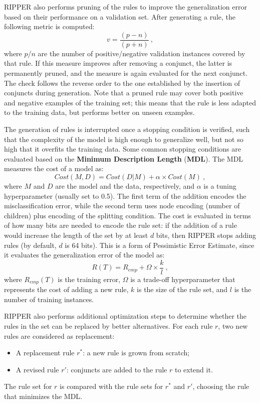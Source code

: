 RIPPER also performs pruning of the rules to improve the generalization error based on their performance on a validation set. After generating a rule, the following metric is computed:
\begin{equation*}
    v = \dfrac{(p-n)}{(p+n)} \ ,
\end{equation*}
where $p$/$n$ are the number of positive/negative validation instances covered by that rule. If this measure improves after removing a conjunct, the latter is permanently pruned, and the measure is again evaluated for the next conjunct. The check follows the reverse order to the one established by the insertion of conjuncts during generation. Note that a pruned rule may cover both positive and negative examples of the training set; this means that the rule is less adapted to the training data, but performs better on unseen examples. 

The generation of rules is interrupted once a stopping condition is verified, such that the complexity of the model is high enough to generalize well, but not so high that it overfits the training data. Some common stopping conditions are evaluated based on the \textbf{Minimum Description Length} (\textbf{MDL}). The MDL measures the cost of a model as:
\begin{equation*}
    \textit{Cost}(M, D) = \textit{Cost}(D|M) + \alpha \times \textit{Cost}(M) \ ,
\end{equation*}
where $M$ and $D$ are the model and the data, respectively, and $\alpha$ is a tuning hyperparameter (usually set to 0.5).  The first term of the addition encodes the misclassification error, while the second term uses node encoding (number of children) plus encoding of the splitting condition. The cost is evaluated in terms of how many bits are needed to encode the rule set: if the addition of a rule would increase the length of the set by at least $d$ bits, then RIPPER stops adding rules (by default, $d$ is 64 bits). This is a form of Pessimistic Error Estimate, since it evaluates the generalization error of the model as:
\begin{equation*}
    R(T) = R_{emp} + \Omega \times \dfrac{k}{l} \ ,
\end{equation*}
where $R_{emp}(T)$ is the training error, $\Omega$ is a trade-off hyperparameter that represents the cost of adding a new rule, $k$ is the size of the rule set, and $l$ is the number of training instances.

RIPPER also performs additional optimization steps to determine whether the rules in the set can be replaced by better alternatives. For each rule $r$, two new rules are considered as replacement:
\begin{itemize}
    \item A replacement rule $r^*$: a new rule is grown from scratch;
    \item A revised rule $r'$: conjuncts are added to the rule $r$ to extend it.
\end{itemize}
The rule set for $r$ is compared with the rule sets for $r^*$ and $r'$, choosing the rule that minimizes the MDL.

